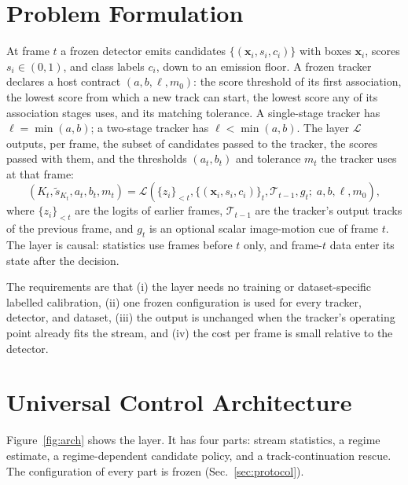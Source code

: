 \documentclass[journal]{new-aiaa}
\begin{document}
\section{Problem Formulation}\label{sec:problem}
At frame $t$ a frozen detector emits candidates $\{(\mathbf{x}_i, s_i, c_i)\}$ with boxes $\mathbf{x}_i$, scores $s_i\in(0,1)$, and class labels $c_i$, down to an emission floor. A frozen tracker declares a host contract $(a, b, \ell, m_0)$: the score threshold of its first association, the lowest score from which a new track can start, the lowest score any of its association stages uses, and its matching tolerance. A single-stage tracker has $\ell=\min(a,b)$; a two-stage tracker has $\ell<\min(a,b)$. The layer $\mathcal{L}$ outputs, per frame, the subset of candidates passed to the tracker, the scores passed with them, and the thresholds $(a_t, b_t)$ and tolerance $m_t$ the tracker uses at that frame:
\begin{equation}
\left(K_t, \tilde s_{K_t}, a_t, b_t, m_t\right) = \mathcal{L}\left(\{z_i\}_{<t}, \{(\mathbf{x}_i, s_i, c_i)\}_t, \mathcal{T}_{t-1}, g_t;\; a,b,\ell,m_0\right),
\label{eq:layer}
\end{equation}
where $\{z_i\}_{<t}$ are the logits of earlier frames, $\mathcal{T}_{t-1}$ are the tracker's output tracks of the previous frame, and $g_t$ is an optional scalar image-motion cue of frame $t$. The layer is causal: statistics use frames before $t$ only, and frame-$t$ data enter its state after the decision.

The requirements are that (i) the layer needs no training or dataset-specific labelled calibration, (ii) one frozen configuration is used for every tracker, detector, and dataset, (iii) the output is unchanged when the tracker's operating point already fits the stream, and (iv) the cost per frame is small relative to the detector.

\section{Universal Control Architecture}\label{sec:arch}
Figure~\ref{fig:arch} shows the layer. It has four parts: stream statistics, a regime estimate, a regime-dependent candidate policy, and a track-continuation rescue. The configuration of every part is frozen (Sec.~\ref{sec:protocol}).
\end{document}
